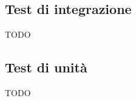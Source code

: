 \documentclass[../piano_di_qualifica.tex]{subfiles}
\begin{document}
\subsection{Test di integrazione}%
\label{sub:test_int}

TODO

\subsection{Test di unità}%
\label{sub:test_unit}

TODO
\end{document}
